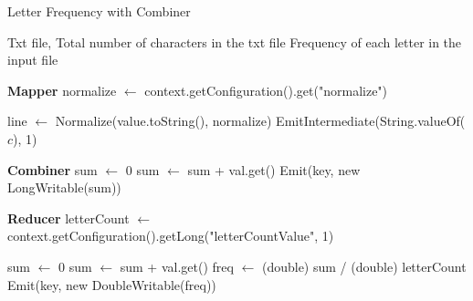 \begin{algorithm}[H]
    \caption{Letter Frequency with Combiner}
    \begin{algorithmic}[1]
        \Require Txt file, Total number of characters in the txt file
        \Ensure Frequency of each letter in the input file

        \Statex
        \noindent \textbf{Mapper}
        \State normalize $\leftarrow$ context.getConfiguration().get("normalize")
        \EndProcedure

        \State line $\leftarrow$ Normalize(value.toString(), normalize) 
        \State EmitIntermediate(String.valueOf($c$), 1)
        \EndFor
        \EndProcedure

        \vspace{1em}

        \Statex
        \noindent \textbf{Combiner}
        \State sum $\leftarrow$ 0
        \State sum $\leftarrow$ sum + val.get()
        \EndFor
        \State Emit(key, new LongWritable(sum))
        \EndProcedure

        \vspace{1em}

        \Statex
        \noindent \textbf{Reducer}
        \State letterCount $\leftarrow$ context.getConfiguration().getLong("letterCountValue", 1)
        \EndProcedure

        \State sum $\leftarrow$ 0
        \State sum $\leftarrow$ sum + val.get()
        \EndFor
        \State freq $\leftarrow$ (double) sum / (double) letterCount
        \State Emit(key, new DoubleWritable(freq))
        \EndProcedure
    \end{algorithmic}
\end{algorithm}
